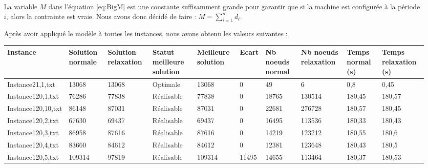 \documentclass[a4paper,12pt]{article}
\theoremstyle{blueDefinition}
\theoremstyle{redProperty}
\begin{document}
La variable $M$ dans l'équation \ref{eq:BigM} est une constante suffisamment grande pour garantir que si la machine est configurée à la période $i$, alors la contrainte est vraie.
Nous avons donc décidé de faire : $ M = \sum_{i=1}^{n} d_i $.

Après avoir appliqué le modèle à toutes les instances, nous avons obtenu les valeurs suivantes :

\begin{table}[htbp]
\hspace*{-2cm} 
\begin{tabular}{|l|p{40pt}|p{40pt}|p{55pt}|p{45pt}|p{35pt}|p{35pt}|p{35pt}|p{35pt}|p{35pt}|}
\hline Instance           & Solution normale & Solution relaxation & Statut meilleure solution & Meilleure solution & Ecart & Nb noeuds normal & Nb noeuds relaxation & Temps normal (s) & Temps relaxation (s) \\ \hline
Instance21,1,txt   & 13068            & 13068               & Optimale                  & 13068              & 0          & 49               & 6                    & 0,8              & 0,45                 \\
Instance120,1,txt  & 76286            & 77838               & Réalisable                & 77838              & 0          & 18765            & 130514               & 180,45           & 180,57               \\
Instance120,10,txt & 86148            & 87031               & Réalisable                & 87031              & 0          & 22681            & 276728               & 180,57           & 180,45               \\
Instance120,2,txt  & 67630            & 69437               & Réalisable                & 69437              & 0          & 16495            & 113536               & 180,33           & 180,43               \\
Instance120,3,txt  & 86958            & 87616               & Réalisable                & 87616              & 0          & 14219            & 123212               & 180,55           & 180,6                \\
Instance120,4,txt  & 83660            & 84612               & Réalisable                & 84612              & 0          & 12381            & 123648               & 180,43           & 180,5                \\
Instance120,5,txt  & 109314           & 97819               & Réalisable                & 109314             & 11495      & 14655            & 113464               & 180,37           & 180,53               \\

\end{tabular}
\end{table}
\end{document}
